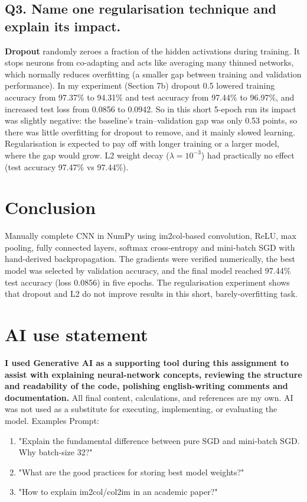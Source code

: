 \documentclass[11pt,a4paper]{article}
\begin{document}
\subsection*{Q3. Name one regularisation technique and explain its impact.}
\textbf{Dropout} randomly zeroes a fraction of the hidden activations during training. It stops neurons from co-adapting and acts like averaging many thinned networks, which normally reduces overfitting (a smaller gap between training and validation performance). In my experiment (Section 7b) dropout 0.5 lowered training accuracy from 97.37\% to 94.31\% and test accuracy from 97.44\% to 96.97\%, and increased test loss from 0.0856 to 0.0942. So in this short 5-epoch run its impact was slightly negative: the baseline's train--validation gap was only 0.53 points, so there was little overfitting for dropout to remove, and it mainly slowed learning. Regularisation is expected to pay off with longer training or a larger model, where the gap would grow. L2 weight decay ($\lambda=10^{-3}$) had practically no effect (test accuracy 97.47\% vs 97.44\%).

\section{Conclusion}
 Manually complete CNN in NumPy using im2col-based convolution, ReLU, max pooling, fully connected layers, softmax cross-entropy and mini-batch SGD with hand-derived backpropagation. The gradients were verified numerically, the best model was selected by validation accuracy, and the final model reached 97.44\% test accuracy (loss 0.0856) in five epochs. The regularisation experiment shows that dropout and L2 do not improve results in this short, barely-overfitting task.

\section*{AI use statement}
\textbf{I used Generative AI as a supporting tool during this assignment to assist with explaining neural-network concepts, reviewing the structure and readability of the code, polishing english-writing comments and documentation.}
All final content, calculations, and references are my own. AI was not used as a substitute for executing, implementing, or evaluating the model.
Examples Prompt:
    \begin{enumerate}
    \item "Explain the fundamental difference between pure SGD and mini-batch SGD. Why batch-size 32?"
    \item {"What are the good practices for storing best model weights?"}
    \item {"How to explain im2col/col2im in an academic paper?"}
    \end{enumerate}
\end{document}
